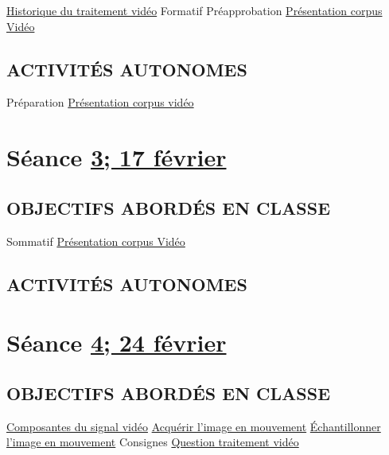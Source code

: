 \documentclass[
]{book}
\begin{document}
\protect\hyperlink{evolution_historique}{Historique du traitement vidéo}
Formatif Préapprobation \protect\hyperlink{sommatif_1}{Présentation corpus Vidéo}

\hypertarget{activituxe9s-autonomes-1}{%
\subsection{ACTIVITÉS AUTONOMES}\label{activituxe9s-autonomes-1}}

Préparation \protect\hyperlink{sommatif_1}{Présentation corpus vidéo}

\hypertarget{semaine_3}{%
\section{\texorpdfstring{Séance \protect\hyperlink{semaine_3}{3; 17 février}}{Séance 3; 17 février}}\label{semaine_3}}

\hypertarget{objectifs-aborduxe9s-en-classe-2}{%
\subsection{OBJECTIFS ABORDÉS EN CLASSE}\label{objectifs-aborduxe9s-en-classe-2}}

Sommatif \protect\hyperlink{sommatif_1}{Présentation corpus Vidéo}

\hypertarget{activituxe9s-autonomes-2}{%
\subsection{ACTIVITÉS AUTONOMES}\label{activituxe9s-autonomes-2}}

\hypertarget{semaine_4}{%
\section{\texorpdfstring{Séance \protect\hyperlink{semaine_4}{4; 24 février}}{Séance 4; 24 février}}\label{semaine_4}}

\hypertarget{objectifs-aborduxe9s-en-classe-3}{%
\subsection{OBJECTIFS ABORDÉS EN CLASSE}\label{objectifs-aborduxe9s-en-classe-3}}

\protect\hyperlink{lexique}{Composantes du signal vidéo}
\protect\hyperlink{acquerir}{Acquérir l'image en mouvement}
\protect\hyperlink{echantillonner}{Échantillonner l'image en mouvement}
Consignes \protect\hyperlink{sommatif_2}{Question traitement vidéo}
\end{document}
